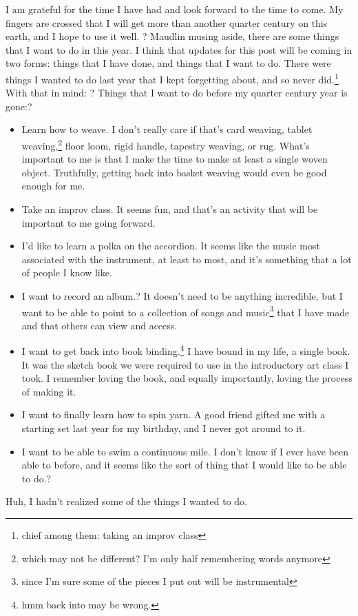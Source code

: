 \documentclass[12pt]{article}[titlepage]
\newcommand{\1}{\={a}}
\newcommand{\2}{\={e}}
\newcommand{\3}{\={\i}}
\newcommand{\4}{\=o}
\newcommand{\5}{\=u}
\newcommand{\6}{\={A}}
\renewcommand{\,}{\textsuperscript{,}}
\begin{document}
I am grateful for the time I have had and look forward to the time to come.
My fingers are crossed that I will get more than another quarter century on this earth, and I hope to use it well.
?
Maudlin musing aside, there are some things that I want to do in this year.
I think that updates for this post will be coming in two forms: things that I have done, and things that I want to do.
There were things I wanted to do last year that I kept forgetting about, and so never did.\footnote{chief among them: taking an improv class}
With that in mind:
?
Things that I want to do before my quarter century year is gone:?
\begin{itemize}
\item Learn how to weave.
I don't really care if that's card weaving, tablet weaving,\footnote{which may not be different? I'm only half remembering words anymore} floor loom, rigid handle, tapestry weaving, or rug.
What's important to me is that I make the time to make at least a single woven object.
Truthfully, getting back into basket weaving would even be good enough for me.
\item Take an improv class.
It seems fun, and that's an activity that will be important to me going forward.
\item I'd like to learn a polka on the accordion.
It seems like the music most associated with the instrument, at least to most, and it's something that a lot of people I know like.
\item I want to record an album.?
It doesn't need to be anything incredible, but I want to be able to point to a collection of songs and music\footnote{since I'm sure some of the pieces I put out will be instrumental} that I have made and that others can view and access.
\item I want to get back into book binding.\footnote{hmm back into may be wrong.} I have bound in my life, a single book.
It was the sketch book we were required to use in the introductory art class I took.
I remember loving the book, and equally importantly, loving the process of making it.
\item I want to finally learn how to spin yarn.
A good friend gifted me with a starting set last year for my birthday, and I never got around to it.
\item I want to be able to swim a continuous mile.
I don't know if I ever have been able to before, and it seems like the sort of thing that I would like to be able to do.?
\end{itemize}
Huh, I hadn't realized some of the things I wanted to do.
\end{document}
